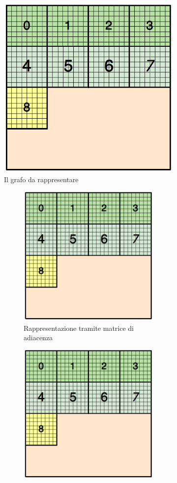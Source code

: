 \begin{figure}[H]
	\centering
	\begin{subfigure}{1.0\textwidth}
		\centering
		\includegraphics[width=0.3\linewidth]{immagini/block_on_grid.png}
		\caption{Il grafo da rappresentare}
	\end{subfigure}
	\begin{subfigure}{1.0\textwidth}
		\centering
		\begin{subfigure}{0.5\textwidth}
			\centering
			\includegraphics[width=0.7\linewidth]{immagini/block_on_grid.png}
			\caption{Rappresentazione tramite matrice di adiacenza}
			\label{fig:matrix_adj}
		\end{subfigure}%
		\begin{subfigure}{0.5\textwidth}
			\centering
			\includegraphics[width=0.7\linewidth]{immagini/block_on_grid.png}

\end{subfigure}
\end{subfigure}
\end{figure}
